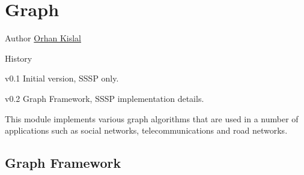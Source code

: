 



\chapter[Graph]{Graph}

\begin{moduleinfo}
\item[Author] \href{mailto:okislal@pivotal.io}{Orhan Kislal}
\item[History]
	\begin{modulehistory}
		\item[v0.1] Initial version, SSSP only.
		\item[v0.2] Graph Framework, SSSP implementation details.
	\end{modulehistory}
\end{moduleinfo}



This module implements various graph algorithms that are used in a number of applications such as social networks, telecommunications and road networks.

\section{Graph Framework} \label{sec:graph:fw}

